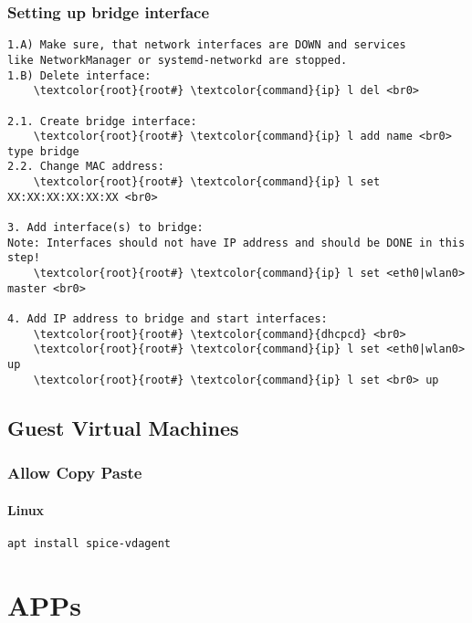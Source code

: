 \documentclass[10pt, a4paper, onecolumn, openany]{book} %
\begin{document}
\subsection{Setting up bridge interface}
\begin{Verbatim}[commandchars=\\\{\}]
1.A) Make sure, that network interfaces are DOWN and services 
like NetworkManager or systemd-networkd are stopped.
1.B) Delete interface:
    \textcolor{root}{root#} \textcolor{command}{ip} l del <br0>

2.1. Create bridge interface:
    \textcolor{root}{root#} \textcolor{command}{ip} l add name <br0> type bridge
2.2. Change MAC address:
    \textcolor{root}{root#} \textcolor{command}{ip} l set XX:XX:XX:XX:XX:XX <br0>

3. Add interface(s) to bridge:
Note: Interfaces should not have IP address and should be DONE in this step!
    \textcolor{root}{root#} \textcolor{command}{ip} l set <eth0|wlan0> master <br0>

4. Add IP address to bridge and start interfaces:
    \textcolor{root}{root#} \textcolor{command}{dhcpcd} <br0>
    \textcolor{root}{root#} \textcolor{command}{ip} l set <eth0|wlan0> up  
    \textcolor{root}{root#} \textcolor{command}{ip} l set <br0> up
\end{Verbatim}

\section{Guest Virtual Machines}
\subsection{Allow Copy Paste}
\subsubsection{Linux}
\begin{Verbatim}[commandchars=\\\{\}]
apt install spice-vdagent
\end{Verbatim}




\chapter{APPs}
\end{document}
